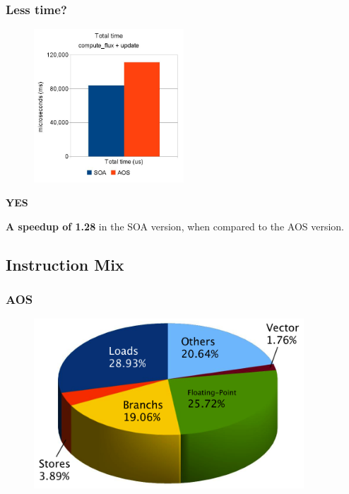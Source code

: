 \documentclass{beamer}
\begin{document}
\begin{frame}
	\frametitle{Less time?}
	\begin{multicols}{2}
		\begin{figure}
			\begin{center}
				\includegraphics[width=0.5\textwidth]{images/slides.april/fnctime.jpg}
			\end{center}
		\end{figure}
				
		\begin{center}
			\huge\bfseries YES
		\end{center}
		
		\textbf{A speedup of 1.28} in the SOA version, when compared to the AOS version.
	\end{multicols}
\end{frame}

\subsection{Instruction Mix}
\begin{frame}
	\frametitle{AOS}
	\begin{figure}
		\begin{center}
			\includegraphics[width=0.9\textwidth]{images/slides.april/instmxAOS.png}
		\end{center}
	\end{figure}
\end{frame}
\end{document}
